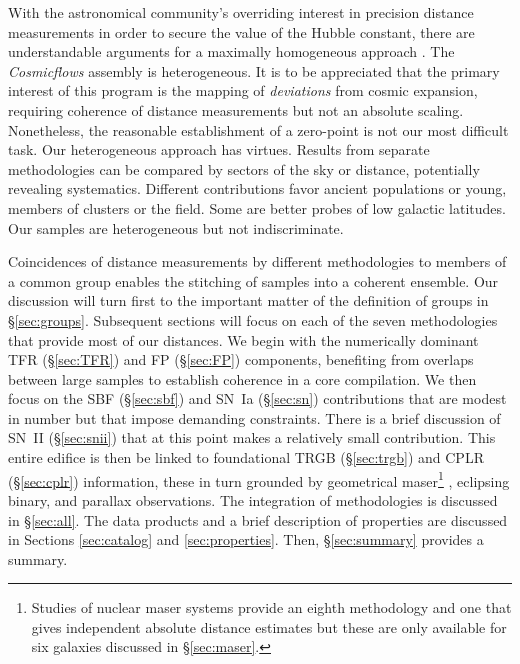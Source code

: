 \documentclass[twocolumn]{aastex63}
\begin{document}
With the astronomical community's overriding interest in precision distance measurements in order to secure the value of the Hubble constant, there are understandable arguments for a maximally homogeneous approach \citep{2016ApJ...826...56R}. The {\it Cosmicflows} assembly is heterogeneous.  It is to be appreciated that the primary interest of this program is the mapping of {\it deviations} from cosmic expansion, requiring coherence of distance measurements but not an absolute scaling.  Nonetheless, the reasonable establishment of a zero-point is not our most difficult task.  Our heterogeneous approach has virtues.  Results from separate methodologies can be compared by sectors of the sky or distance, potentially revealing systematics.  Different contributions favor ancient populations or young, members of clusters or the field.  Some are better probes of low galactic latitudes.  Our samples are heterogeneous but not indiscriminate.

Coincidences of distance measurements by different methodologies to members of a common group enables the stitching of samples into a coherent ensemble.  Our discussion will turn first to the important matter of the definition of groups in \S\ref{sec:groups}.
Subsequent sections will focus on each of the seven methodologies that provide most of our distances.  We begin with the numerically dominant TFR (\S\ref{sec:TFR}) and FP (\S\ref{sec:FP}) components, benefiting from overlaps between large samples to establish coherence in a core compilation. We then focus on the SBF (\S\ref{sec:sbf}) and SN~Ia (\S\ref{sec:sn}) contributions that are modest in number but that impose demanding constraints. There is a brief discussion of SN~II (\S\ref{sec:snii}) that at this point makes a relatively small contribution.  This entire edifice is then be linked to foundational TRGB (\S\ref{sec:trgb}) and CPLR (\S\ref{sec:cplr}) information, these in turn grounded by geometrical maser\footnote{Studies of nuclear maser systems provide an eighth methodology and one that gives independent absolute distance estimates but these are only available for six galaxies discussed in \S\ref{sec:maser}.} , eclipsing binary, and parallax observations.  The integration of methodologies is discussed in \S \ref{sec:all}.  The data products and a brief description of properties are discussed in Sections \ref{sec:catalog} and  \ref{sec:properties}.  Then, \S \ref{sec:summary} provides a summary.


\end{document}
